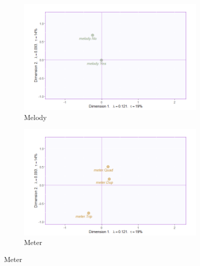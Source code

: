 \documentclass[
]{article}
\begin{document}
\begin{figure}
\begin{subfigure}[b]{.45\linewidth}
\includegraphics[width=\linewidth]{./supmatsimgs/qjmelody.png}
\caption{Melody}\label{fig:melody}
\end{subfigure}
\begin{subfigure}[b]{.45\linewidth}
\includegraphics[width=\linewidth]{./supmatsimgs/qjmeter.png}
\caption{Meter}\label{fig:meter}
\end{subfigure}
\end{figure}
\end{document}
